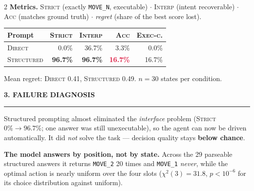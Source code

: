 \documentclass[9pt,a4paper]{extarticle}
\newcommand{\heading}[1]{%
  \par\vspace{1.4mm}\noindent
  {\color{navy}\bfseries\small\MakeUppercase{#1}}
  \par\vspace{0.7mm}\noindent
  {\color{amber}\rule{\linewidth}{1.1pt}}
  \par\vspace{0.6mm}\noindent\ignorespaces}
\begin{document}
\begin{multicols}{2}
\textbf{Metrics.} \textsc{Strict} (exactly \texttt{MOVE\_N}, executable) $\cdot$ \textsc{Interp} (intent recoverable) $\cdot$ \textsc{Acc} (matches ground truth) $\cdot$ \emph{regret} (share of the best score lost).

\vspace{0.8mm}
{\centering
\begin{tabular}{@{}lrrrr@{}}
\toprule
\textbf{Prompt} & \textsc{Strict} & \textsc{Interp} & \textsc{Acc} & \textsc{Exec-c.}\\
\midrule
\textsc{Direct}     & 0.0\%  & 36.7\% & 3.3\%  & 0.0\%\\
\textsc{Structured} & \textbf{96.7\%} & \textbf{96.7\%} & \textcolor{crimson}{\textbf{16.7\%}} & 16.7\%\\
\bottomrule
\end{tabular}\par}
\vspace{0.4mm}
{\footnotesize Mean regret: \textsc{Direct} 0.41, \textsc{Structured} 0.49. $n=30$ states per condition.}

\heading{3. Failure diagnosis}
Structured prompting almost eliminated the \emph{interface} problem (\textsc{Strict} $0\%\rightarrow96.7\%$; one answer was still unexecutable), so the agent can now be driven automatically. It did \emph{not} solve the task --- decision quality stays \textbf{below chance}.

\textbf{The model answers by position, not by state.} Across the 29 parseable structured answers it returns \texttt{MOVE\_2} 20 times and \texttt{MOVE\_1} \emph{never}, while the optimal action is nearly uniform over the four slots ($\chi^2(3)=31.8$, $p<10^{-6}$ for its choice distribution against uniform).

\vspace{0.5mm}
{\centering
{}\par}
\vspace{-0.5mm}


\end{multicols}
\end{document}
